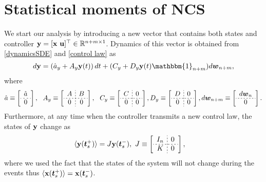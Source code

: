 \documentclass[letterpaper, 10 pt,one column, conference]{ieeeconf}  %
\begin{document}
\section{Statistical moments of NCS}
We start our analysis by introducing a new vector that  contains both states and controller $\bold y= [\bold x \ \bold u]^\top\in \mathbb{R}^{n+m\times 1}$. Dynamics of this vector is obtained from \eqref{dynamicsSDE} and \eqref{control law} as
\begin{equation}
d\bold y= \left(\hat{a}_y+A_y \bold y (t)\right)dt + (C_y+D_y\bold{y}(t)\mathbbm{1}_{n+m})d \boldsymbol w_{n+m} ,
		\label{dynamicsSDE2}	
\end{equation}
where 
	\begin{equation}
 \hat{a}\equiv  \left[\begin{array}{c}
	\hat{a}\\ \hdashline[2pt/2pt]0 
	\end{array}\right],  \ \  A_y\equiv  \left[\begin{array}{c;{2pt/2pt}c}
	A & B\\ \hdashline[2pt/2pt]0 & 0 
	\end{array}\right],\ \ 
C_y\equiv  \left[\begin{array}{c;{2pt/2pt}c}
	C & 0\\ \hdashline[2pt/2pt]0 & 0 	\end{array}\right], D_y\equiv  \left[\begin{array}{c;{2pt/2pt}c}
	D & 0\\ \hdashline[2pt/2pt]0 & 0 	\end{array}\right], d \boldsymbol w_{n+m} \equiv  \left[\begin{array}{c}
	d \boldsymbol w_{n} \\ \hdashline[2pt/2pt]0  	\end{array}\right].
	\end{equation}
Furthermore, at any time when the controller transmits a new control law, the states of $\bold y$ change as
\begin{align}
&\langle \bold{y} (\boldsymbol{t}_s^+)\rangle=  J\bold{y}(\boldsymbol{t}_s^-), \ J \equiv \left[\begin{array}{c;{2pt/2pt}c}
	I_n & 0\\ \hdashline[2pt/2pt] K & 0 	\end{array}\right],\label{conditional x}
\end{align}
where we used the fact that the states of the system will not change during the events thus $\langle \bold x( \boldsymbol t_s^+) \rangle=\bold x( \boldsymbol t_s^-)$.
\end{document}
